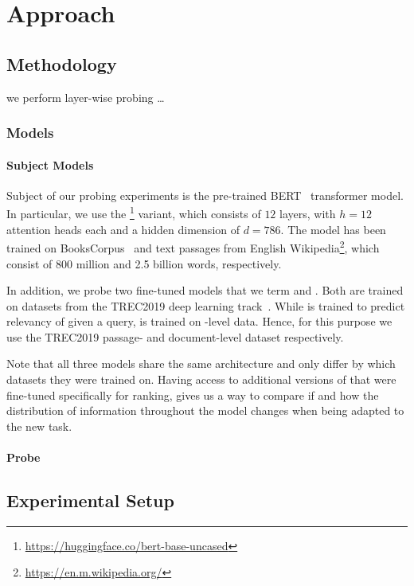 \chapter{Approach}
\label{chap:approach}

\section{Methodology}
we perform layer-wise probing \dots
\subsection{Models}
\subsubsection{Subject Models}
Subject of our probing experiments is the pre-trained BERT~\cite{devlin-etal-2019-bert} transformer model. In particular, we use the \footnote{\url{https://huggingface.co/bert-base-uncased}} variant, which consists of $12$ layers, with $h=12$ attention heads each and a hidden dimension of $d=786$. The model has been trained on BooksCorpus~\cite{7410368} and text passages from English Wikipedia\footnote{\url{https://en.m.wikipedia.org/}}, which consist of 800 million and 2.5 billion words, respectively.

In addition, we probe two fine-tuned  models that we term  and . Both are trained on datasets from the TREC2019 deep learning track~\cite{DBLP:journals/corr/abs-2003-07820}. While  is trained to predict relevancy of  given a query,  is trained on -level data. Hence, for this purpose we use the TREC2019 passage- and document-level dataset respectively.

Note that all three models share the same architecture and only differ by which datasets they were trained on. Having access to additional versions of  that were fine-tuned specifically for ranking, gives us a way to compare if and how the distribution of information throughout the model changes when being adapted to the new task.

\subsubsection{Probe}



\section{Experimental Setup}
